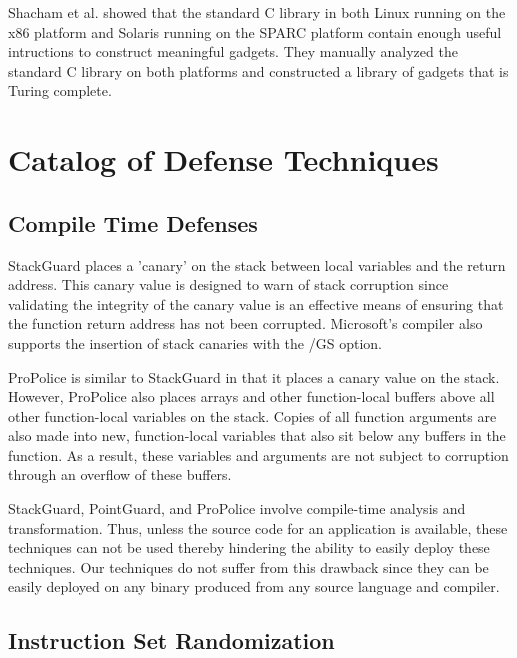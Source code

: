 Shacham et al. showed that the standard C library in both Linux running on the x86 platform and
Solaris running on the SPARC platform contain enough useful intructions to construct meaningful
gadgets. They manually analyzed the standard C library on both platforms and constructed a library
of gadgets that is Turing complete.

\section{Catalog of Defense Techniques}

\subsection{Compile Time Defenses}

StackGuard \cite{stackguard-98} places a 'canary' on the stack between local variables and the
return address. This canary value is designed to warn of stack corruption since validating the
integrity of the canary value is an effective means of ensuring that the function return address has
not been corrupted. Microsoft's compiler also supports the insertion of stack canaries with the /GS
option.

ProPolice \cite{} is similar to StackGuard in that it places a canary value on the stack. However,
ProPolice also places arrays and other function-local buffers above all other function-local
variables on the stack. Copies of all function arguments are also made into new, function-local
variables that also sit below any buffers in the function. As a result, these variables and
arguments are not subject to corruption through an overflow of these buffers. 

StackGuard, PointGuard, and ProPolice involve compile-time analysis and transformation. Thus, unless
the source code for an application is available, these techniques can not be used thereby hindering
the ability to easily deploy these techniques. Our techniques do not suffer from this drawback since
they can be easily deployed on any binary produced from any source language and compiler.

\subsection{Instruction Set Randomization}

